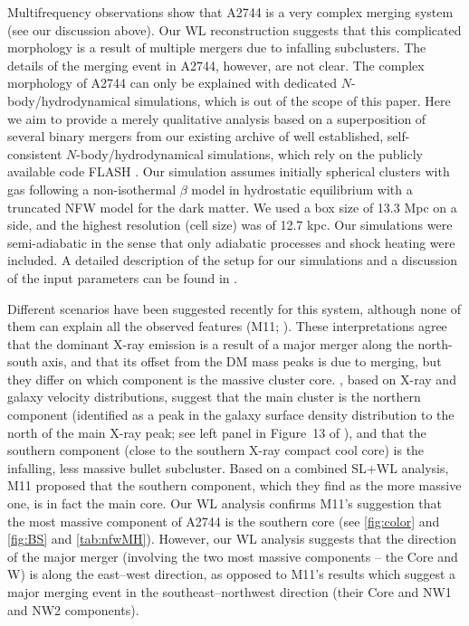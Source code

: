 \documentclass[iop,twocolumn]{emulateapj}
\begin{document}
Multifrequency observations show that A2744 is a very complex merging
system (see our discussion above).  Our WL reconstruction suggests
that this complicated morphology is a result of multiple mergers due
to infalling subclusters. 
The details of the merging event in A2744, however, are not clear.
%
The complex morphology of A2744 can only be explained 
with dedicated $N$-body/hydrodynamical simulations, 
which is out of the scope of this paper. 
Here we aim to provide a merely qualitative analysis based 
on a superposition of several binary mergers from our existing archive of well established, self-consistent $N$-body/hydrodynamical 
simulations, which rely on the publicly available code FLASH \citep{Fryxell2000}.  
Our simulation assumes initially spherical clusters with gas following 
a non-isothermal $\beta$ model in hydrostatic equilibrium with a truncated NFW 
model for the dark matter. We used a box size of 13.3 Mpc on a side, and 
the highest resolution (cell size) was of 12.7 kpc.
Our simulations were semi-adiabatic in the sense that only adiabatic processes and 
shock heating were included. A detailed description of the setup for our simulations 
and a discussion of the input parameters can be found in \cite{Molnar2012}.  

Different scenarios have been suggested recently for this system,
although none of them can explain all the observed features
(M11; \citet{Owers2011}).  These interpretations agree that the
dominant X-ray emission
is a result of a major merger along the north-south axis, and that its
offset from the DM mass peaks is due to merging, but they differ on
which component is the massive cluster core.  \cite{Owers2011},
based on X-ray and galaxy velocity distributions, suggest
that the main cluster is the northern component (identified as a peak
in the galaxy surface density distribution to the north of the main X-ray
peak; see left panel in Figure~13 of \citet{Owers2011}), and that the
southern component (close to the southern X-ray compact cool core) is
the infalling, less massive bullet subcluster. Based on a combined SL+WL analysis, M11 proposed that the southern component, which they find as the more massive one, is in fact the main core. 
Our WL analysis confirms M11's suggestion that the most massive 
component of A2744 is the southern core (see \autoref{fig:color} and \autoref{fig:BS}  and \autoref{tab:nfwMH}). 
However, our WL analysis suggests that the direction of the major 
merger (involving the two most massive components -- the Core and W) 
is along the east--west direction, as opposed to M11's results which 
suggest a major merging event in the southeast--northwest 
direction (their Core and NW1 and NW2 components).
\end{document}
